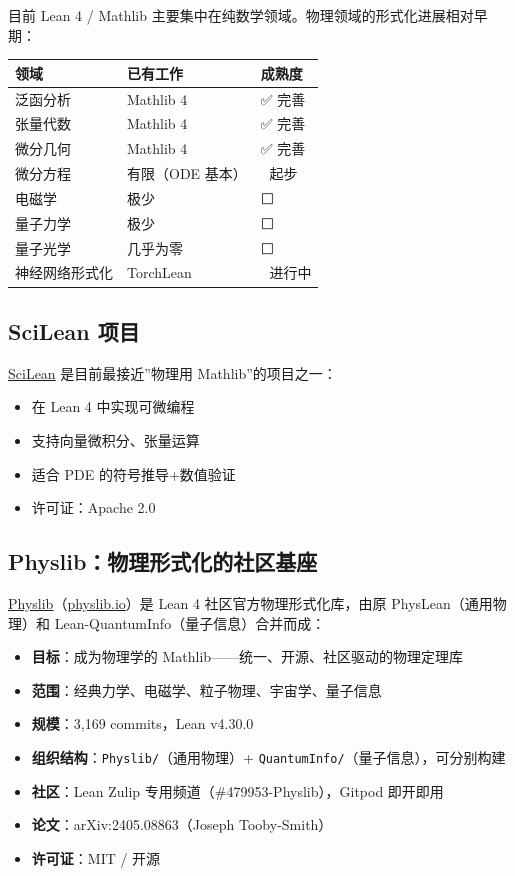 \documentclass[
  11pt,
  a4paper,
]{ctexrep}
\newcounter{none} %
\providecommand{\tightlist}{%
  \setlength{\itemsep}{0pt}\setlength{\parskip}{0pt}}
\begin{document}
目前 Lean 4 / Mathlib
主要集中在纯数学领域。物理领域的形式化进展相对早期：

{\def\LTcaptype{none} %
\begin{longtable}[]{@{}lll@{}}
\toprule\noalign{}
领域 & 已有工作 & 成熟度 \\
\midrule\noalign{}
\endhead
\bottomrule\noalign{}
\endlastfoot
泛函分析 & Mathlib 4 & ✅ 完善 \\
张量代数 & Mathlib 4 & ✅ 完善 \\
微分几何 & Mathlib 4 & ✅ 完善 \\
微分方程 & 有限（ODE 基本） & 🔄 起步 \\
电磁学 & 极少 & ⬜ \\
量子力学 & 极少 & ⬜ \\
量子光学 & 几乎为零 & ⬜ \\
神经网络形式化 & TorchLean & 🔄 进行中 \\
\end{longtable}
}

\subsection{SciLean 项目}\label{scilean-ux9879ux76ee}

\href{https://github.com/lecopivo/SciLean}{SciLean} 是目前最接近''物理用
Mathlib''的项目之一：

\begin{itemize}
\tightlist
\item
  在 Lean 4 中实现可微编程
\item
  支持向量微积分、张量运算
\item
  适合 PDE 的符号推导+数值验证
\item
  许可证：Apache 2.0
\end{itemize}

\subsection{Physlib：物理形式化的社区基座}\label{physlibux7269ux7406ux5f62ux5f0fux5316ux7684ux793eux533aux57faux5ea7}

\href{https://github.com/leanprover-community/physlib}{Physlib}（\href{https://physlib.io}{physlib.io}）是
Lean 4 社区官方物理形式化库，由原 PhysLean（通用物理）和
Lean-QuantumInfo（量子信息）合并而成：

\begin{itemize}
\tightlist
\item
  \textbf{目标}：成为物理学的
  Mathlib------统一、开源、社区驱动的物理定理库
\item
  \textbf{范围}：经典力学、电磁学、粒子物理、宇宙学、量子信息
\item
  \textbf{规模}：3,169 commits，Lean v4.30.0
\item
  \textbf{组织结构}：\texttt{Physlib/}（通用物理）+
  \texttt{QuantumInfo/}（量子信息），可分别构建
\item
  \textbf{社区}：Lean Zulip 专用频道（\#479953-Physlib），Gitpod
  即开即用
\item
  \textbf{论文}：arXiv:2405.08863（Joseph Tooby-Smith）
\item
  \textbf{许可证}：MIT / 开源
\end{itemize}
\end{document}
